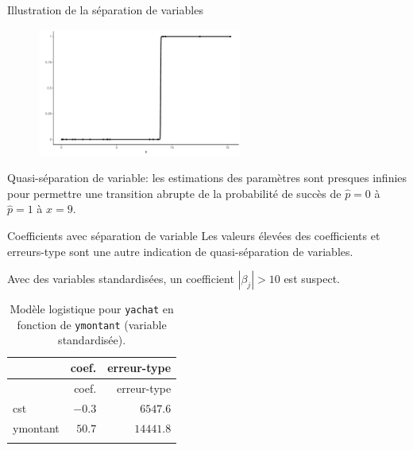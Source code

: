 \documentclass[
  ignorenonframetext,
]{beamer}
\begin{document}
\begin{frame}{Illustration de la séparation de variables}
\protect\hypertarget{illustration-de-la-suxe9paration-de-variables}{}
\begin{figure}

{\centering \includegraphics[width=0.6\textwidth,height=\textheight]{MATH60602-diapos6_files/figure-beamer/unnamed-chunk-22-1.pdf}

}

\end{figure}

\footnotesize

Quasi-séparation de variable: les estimations des paramètres sont
presques infinies pour permettre une transition abrupte de la
probabilité de succès de \(\widehat{p}=0\) à \(\widehat{p}=1\) à
\(x=9\).

\normalsize
\end{frame}

\begin{frame}[fragile]{Coefficients avec séparation de variable}
\protect\hypertarget{coefficients-avec-suxe9paration-de-variable}{}
Les valeurs élevées des coefficients et erreurs-type sont une autre
indication de quasi-séparation de variables.

Avec des variables standardisées, un coefficient \(|\beta_j| > 10\) est
suspect.

\hypertarget{tbl-quasisep}{}
\begin{longtable}[]{@{}lrr@{}}
\caption{\label{tbl-quasisep}Modèle logistique pour \texttt{yachat} en
fonction de \texttt{ymontant} (variable standardisée).}\tabularnewline
\toprule\noalign{}
& coef. & erreur-type \\
\midrule\noalign{}
\endfirsthead
\toprule\noalign{}
& coef. & erreur-type \\
\midrule\noalign{}
\endhead
cst & \(-0.3\) & \(6547.6\) \\
ymontant & \(50.7\) & \(14441.8\) \\
\bottomrule\noalign{}
\end{longtable}
\end{frame}
\end{document}
